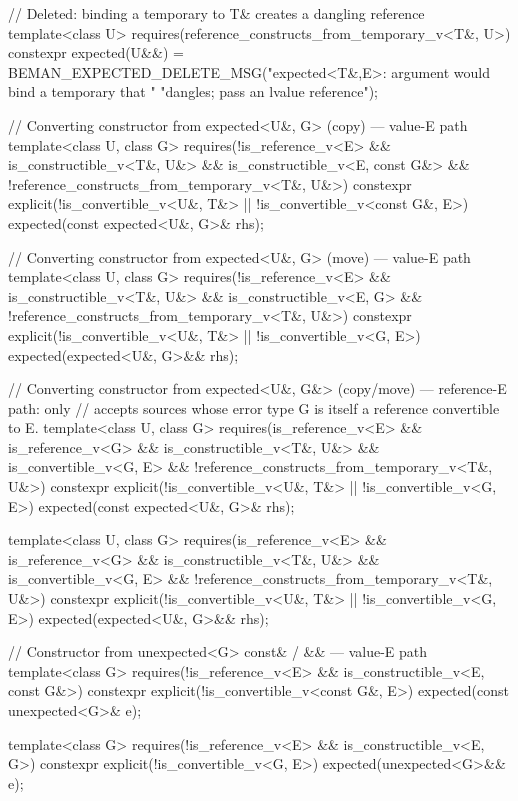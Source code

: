 \begin{codeblock}
{{    // Deleted: binding a temporary to T& creates a dangling reference
    template<class U>
      requires(reference_constructs_from_temporary_v<T&, U>)
    constexpr expected(U&&) =
        BEMAN_EXPECTED_DELETE_MSG("expected<T&,E>: argument would bind a temporary that "
                                  "dangles; pass an lvalue reference");

    // Converting constructor from expected<U&, G> (copy) — value-E path
    template<class U, class G>
      requires(!is_reference_v<E> && is_constructible_v<T&, U&> &&
               is_constructible_v<E, const G&> &&
               !reference_constructs_from_temporary_v<T&, U&>)
    constexpr explicit(!is_convertible_v<U&, T&> || !is_convertible_v<const G&, E>)
        expected(const expected<U&, G>& rhs);

    // Converting constructor from expected<U&, G> (move) — value-E path
    template<class U, class G>
      requires(!is_reference_v<E> && is_constructible_v<T&, U&> &&
               is_constructible_v<E, G> && !reference_constructs_from_temporary_v<T&, U&>)
    constexpr explicit(!is_convertible_v<U&, T&> || !is_convertible_v<G, E>)
        expected(expected<U&, G>&& rhs);

    // Converting constructor from expected<U&, G&> (copy/move) — reference-E path: only
    // accepts sources whose error type G is itself a reference convertible to E.
    template<class U, class G>
      requires(is_reference_v<E> && is_reference_v<G> && is_constructible_v<T&, U&> &&
               is_convertible_v<G, E> && !reference_constructs_from_temporary_v<T&, U&>)
    constexpr explicit(!is_convertible_v<U&, T&> || !is_convertible_v<G, E>)
        expected(const expected<U&, G>& rhs);

    template<class U, class G>
      requires(is_reference_v<E> && is_reference_v<G> && is_constructible_v<T&, U&> &&
               is_convertible_v<G, E> && !reference_constructs_from_temporary_v<T&, U&>)
    constexpr explicit(!is_convertible_v<U&, T&> || !is_convertible_v<G, E>)
        expected(expected<U&, G>&& rhs);

    // Constructor from unexpected<G> const& / && — value-E path
    template<class G>
      requires(!is_reference_v<E> && is_constructible_v<E, const G&>)
    constexpr explicit(!is_convertible_v<const G&, E>) expected(const unexpected<G>& e);

    template<class G>
      requires(!is_reference_v<E> && is_constructible_v<E, G>)
    constexpr explicit(!is_convertible_v<G, E>) expected(unexpected<G>&& e);

}}
\end{codeblock}
